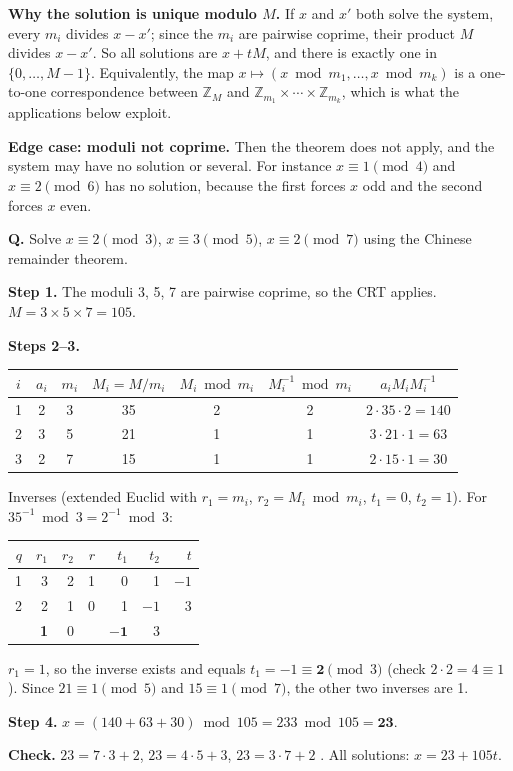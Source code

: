 \textbf{Why the solution is unique modulo $M$.} If $x$ and $x'$ both solve the system, every $m_i$ divides $x - x'$; since the $m_i$ are pairwise coprime, their product $M$ divides $x - x'$. So all solutions are $x + tM$, and there is exactly one in $\{0, \dots, M - 1\}$. Equivalently, the map $x \mapsto (x \bmod m_1, \dots, x \bmod m_k)$ is a one-to-one correspondence between $\mathbb{Z}_M$ and $\mathbb{Z}_{m_1} \times \cdots \times \mathbb{Z}_{m_k}$, which is what the applications below exploit.

\textbf{Edge case: moduli not coprime.} Then the theorem does not apply, and the system may have no solution or several. For instance $x \equiv 1 \pmod 4$ and $x \equiv 2 \pmod 6$ has no solution, because the first forces $x$ odd and the second forces $x$ even.

\begin{worked}
\textbf{Q.} Solve $x \equiv 2 \pmod 3$, $x \equiv 3 \pmod 5$, $x \equiv 2 \pmod 7$ using the Chinese remainder theorem.

\textbf{Step 1.} The moduli 3, 5, 7 are pairwise coprime, so the CRT applies. $M = 3 \times 5 \times 7 = 105$.

\textbf{Steps 2--3.}
\begin{center}\small
\begin{tabular}{@{}ccccccc@{}}
\toprule
$i$ & $a_i$ & $m_i$ & $M_i = M/m_i$ & $M_i \bmod m_i$ & $M_i^{-1} \bmod m_i$ & $a_i M_i M_i^{-1}$\\
\midrule
1 & 2 & 3 & 35 & 2 & 2 & $2 \cdot 35 \cdot 2 = 140$\\
2 & 3 & 5 & 21 & 1 & 1 & $3 \cdot 21 \cdot 1 = 63$\\
3 & 2 & 7 & 15 & 1 & 1 & $2 \cdot 15 \cdot 1 = 30$\\
\bottomrule
\end{tabular}
\end{center}
Inverses (extended Euclid with $r_1 = m_i$, $r_2 = M_i \bmod m_i$, $t_1 = 0$, $t_2 = 1$). For $35^{-1} \bmod 3 = 2^{-1} \bmod 3$:
\begin{center}\small
\begin{tabular}{@{}rrrrrrr@{}}
$q$ & $r_1$ & $r_2$ & $r$ & $t_1$ & $t_2$ & $t$\\ \midrule
1 & 3 & 2 & 1 & 0 & 1 & $-1$\\
2 & 2 & 1 & 0 & 1 & $-1$ & 3\\
 & \textbf{1} & 0 & & $\mathbf{-1}$ & 3 & \\
\end{tabular}
\end{center}
$r_1 = 1$, so the inverse exists and equals $t_1 = -1 \equiv \mathbf{2} \pmod 3$ (check $2 \cdot 2 = 4 \equiv 1$). Since $21 \equiv 1 \pmod 5$ and $15 \equiv 1 \pmod 7$, the other two inverses are 1.

\textbf{Step 4.} $x = (140 + 63 + 30) \bmod 105 = 233 \bmod 105 = \mathbf{23}$.

\textbf{Check.} $23 = 7 \cdot 3 + 2$, $23 = 4 \cdot 5 + 3$, $23 = 3 \cdot 7 + 2$ \checkmark. All solutions: $x = 23 + 105t$.
\end{worked}

